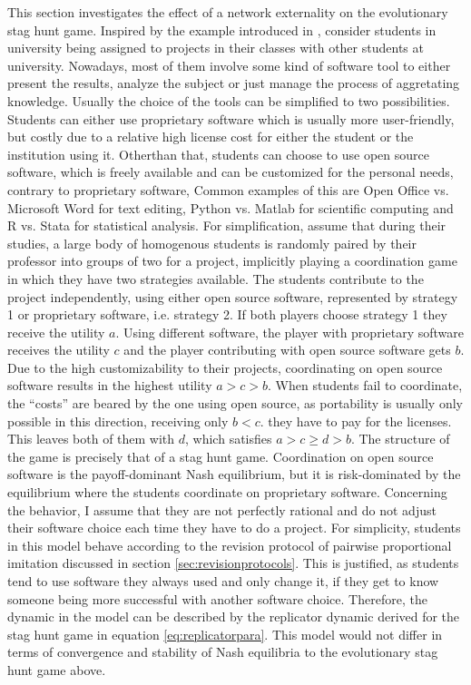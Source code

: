 \label{sec:simplemodel}
This section investigates the effect of a network externality on the
evolutionary stag hunt game. Inspired by the example introduced in
\textcite{kandori_learning_1993}, 
consider students in university being assigned to
projects in their classes with other students at university. 
Nowadays, most of them involve some kind of software tool to either 
present the results, analyze the subject or just manage the process of aggretating 
knowledge. Usually the choice of the tools can be simplified to two 
possibilities. Students can either use proprietary software
which is usually more user-friendly, but costly due to a relative high 
license cost for either the student or the institution using it. 
Otherthan that, students can choose to use open source software, 
which is freely available and can be customized for the personal needs, 
contrary to proprietary software,
Common examples of this are Open Office
vs. Microsoft Word for text editing, Python vs. Matlab for scientific 
computing and R vs. Stata for statistical analysis.
For simplification, assume that during their studies, a large body of 
homogenous students is randomly paired by their professor into groups of two 
for a project, implicitly playing a coordination game in which they have two 
strategies available. The students contribute to the project 
independently, using either open source software, 
represented by strategy 1 or proprietary software, i.e. strategy 2.
If both players choose strategy 1 they receive 
the utility $a$. Using different software, the player with 
proprietary software receives the utility $c$ and
the player contributing with open source software gets $b$.
Due to the high customizability to their projects, coordinating on open
source software results in the highest utility $a>c>b$.
When students fail to coordinate, the ``costs'' are beared
by the one using open source, as portability is usually only possible in 
this direction, receiving only $b<c$.
they have to pay for the licenses. This leaves both of them with $d$, which
satisfies $a >c \geq d >b$.
The structure of the game is precisely that of a stag hunt game. 
Coordination on open source software is the payoff-dominant Nash equilibrium,
but it is risk-dominated by the equilibrium where the students coordinate on
proprietary software. 
Concerning the behavior, I assume that they are not perfectly rational and
do not adjust their software choice each time they have to do a project.
For simplicity, students in this model behave according to the 
revision protocol of pairwise proportional imitation discussed in section 
\ref{sec:revisionprotocols}. 
This is justified, as students tend to use software they always used and 
only change it, if they get to know someone being more successful with
another software choice. Therefore, the dynamic in the model can be 
described by the replicator dynamic derived for the stag hunt game in 
equation \eqref{eq:replicatorpara}.
This model would not differ in terms of convergence and stability of Nash 
equilibria to the evolutionary stag hunt game above.


